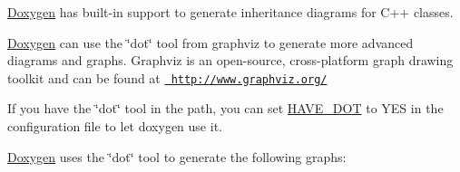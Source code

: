 \mbox{\hyperlink{class_doxygen}{Doxygen}} has built-\/in support to generate inheritance diagrams for C++ classes.

\mbox{\hyperlink{class_doxygen}{Doxygen}} can use the \char`\"{}dot\char`\"{} tool from graphviz to generate more advanced diagrams and graphs. Graphviz is an open-\/source, cross-\/platform graph drawing toolkit and can be found at \href{http://www.graphviz.org/}{\texttt{ http\+://www.\+graphviz.\+org/}}

If you have the \char`\"{}dot\char`\"{} tool in the path, you can set \mbox{\hyperlink{config_cfg_have_dot}{H\+A\+V\+E\+\_\+\+D\+OT}} to {\ttfamily Y\+ES} in the configuration file to let doxygen use it.

\mbox{\hyperlink{class_doxygen}{Doxygen}} uses the \char`\"{}dot\char`\"{} tool to generate the following graphs\+: 
